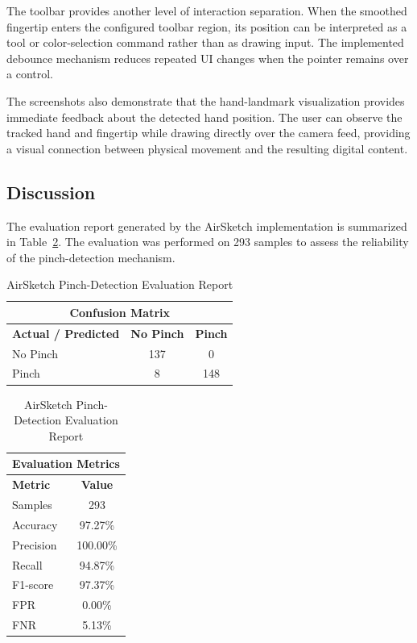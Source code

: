 \documentclass[conference]{IEEEtran}
\begin{document}
The toolbar provides another level of interaction separation. When the smoothed fingertip enters the configured toolbar region, its position can be interpreted as a tool or color-selection command rather than as drawing input. The implemented debounce mechanism reduces repeated UI changes when the pointer remains over a control.

The screenshots also demonstrate that the hand-landmark visualization provides immediate feedback about the detected hand position. The user can observe the tracked hand and fingertip while drawing directly over the camera feed, providing a visual connection between physical movement and the resulting digital content.

\subsection{Discussion}

The evaluation report generated by the AirSketch implementation is summarized in Table~\ref{tab:evaluation_report}. The evaluation was performed on 293 samples to assess the reliability of the pinch-detection mechanism.

\begin{table}[!htbp]
\centering
\caption{AirSketch Pinch-Detection Evaluation Report}
\label{tab:evaluation_report}

\setlength{\tabcolsep}{8pt}
\renewcommand{\arraystretch}{1.35}

\begin{tabular}{lcc}
\hline
\multicolumn{3}{c}{\textbf{Confusion Matrix}} \\
\hline
\textbf{Actual / Predicted} & \textbf{No Pinch} & \textbf{Pinch} \\
\hline
No Pinch & 137 & 0 \\
Pinch    & 8   & 148 \\
\hline
\end{tabular}

\vspace{0.35cm}

\begin{tabular}{lc}
\hline
\multicolumn{2}{c}{\textbf{Evaluation Metrics}} \\
\hline
\textbf{Metric} & \textbf{Value} \\
\hline
Samples   & 293 \\
Accuracy  & 97.27\% \\
Precision & 100.00\% \\
Recall    & 94.87\% \\
F1-score  & 97.37\% \\
FPR       & 0.00\% \\
FNR       & 5.13\% \\
\hline
\end{tabular}
\end{table}
\end{document}
